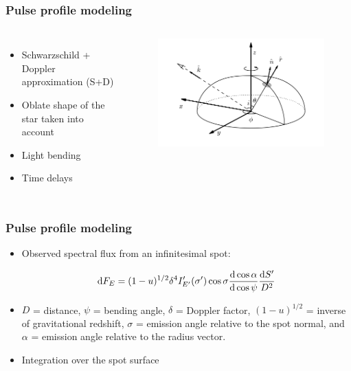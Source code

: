 \documentclass{beamer}
\def\be{\begin{equation}}
\def\ee{\end{equation}}
\def\d{{\rm d}}
\def\Dop{\delta}
\begin{document}
\begin{frame}
\frametitle{Pulse profile modeling}
\begin{columns}[t] %
\begin{itemize}

\item Schwarzschild + Doppler approximation (S+D)
\item Oblate shape of the star taken into account
\item Light bending
\item Time delays

\end{itemize}
\begin{figure}
\includegraphics[width=1.1\linewidth]{fig2.png}
\end{figure}
\end{columns}
\end{frame}



\begin{frame}
\frametitle{Pulse profile modeling}
 
\begin{itemize}

\item Observed spectral flux from an infinitesimal spot:

\be \label{eq:fluxspot2}
\d F_{E}=(1-u)^{1/2} \Dop^{4} I'_{E'}(\sigma') \cos\sigma
\frac{\d \cos\alpha}{\d\cos\psi}
 \frac{\d S'}{D^2} 
\ee

\item $D$ = distance, $\psi$ = bending angle, $\Dop$ = Doppler factor, $(1-u)^{1/2}$ = inverse of gravitational redshift, $\sigma$  = emission angle relative to the spot normal, and $\alpha$  = emission angle relative to the radius vector.
\item Integration over the spot surface
\end{itemize}

\end{frame}
\end{document}
